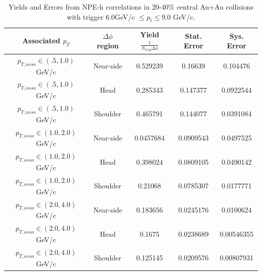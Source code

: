 \begin{table}
\centering
\begin{tabular}{|c|c|c|c|c|}
\hline
Associated $p_T$	& $\Delta\phi$ region & Yield $\frac{1}{N_{trig} \Delta\phi}$ & Stat. Error & Sys. Error\\
\hline
$p_{T,asso} \in(.5, 1.0)$ GeV/c  & Near-side & 0.529239 & 0.16639 & 0.104476 \\
\hline
$p_{T,asso} \in(.5, 1.0)$ GeV/c  & Head & 0.285343 & 0.147377 & 0.0922544 \\
\hline
$p_{T,asso} \in(.5, 1.0)$ GeV/c  & Shoulder & 0.465791 & 0.144077 & 0.0391084 \\
\hline
$p_{T,asso} \in(1.0, 2.0)$ GeV/c  & Near-side & 0.0457684 & 0.0909543 & 0.0497525 \\
\hline
$p_{T,asso} \in(1.0, 2.0)$ GeV/c  & Head & 0.398024 & 0.0809105 & 0.0490142 \\
\hline
$p_{T,asso} \in(1.0, 2.0)$ GeV/c  & Shoulder & 0.21068 & 0.0785307 & 0.0177771 \\
\hline
$p_{T,asso} \in(2.0, 4.0)$ GeV/c  & Near-side & 0.183656 & 0.0245176 & 0.0100624 \\
\hline
$p_{T,asso} \in(2.0, 4.0)$ GeV/c  & Head & 0.1675 & 0.0238689 & 0.00546355 \\
\hline
$p_{T,asso} \in(2.0, 4.0)$ GeV/c  & Shoulder & 0.125145 & 0.0209576 & 0.00807931 \\
\hline
\end{tabular}
\caption[Yields and Errors in Au+Au Correlations, 20-40\%, High Trigger]{Yields and Errors from NPE-h correlations in 20-40\% central Au+Au collisions with trigger $6.0 $GeV/c $\leq p_t \leq 9.0$ GeV/c.}
\label{tab:AuAuYieldMidHigh}
\end{table} 

